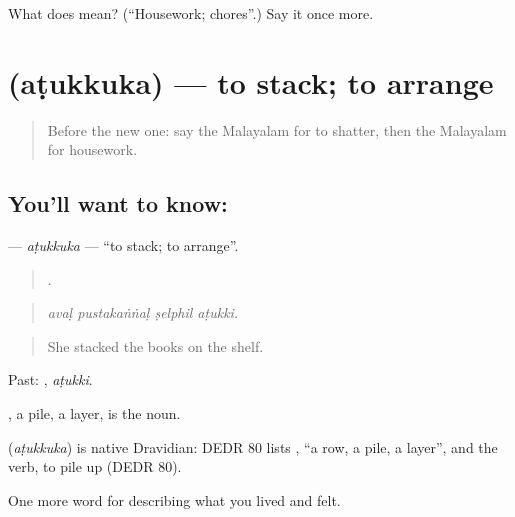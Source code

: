 \begin{tcolorbox}[breakable,colback=teal!4,colframe=teal!35!black,title={Before you move on}]
What does  mean? (\textquotedblleft{}Housework; chores\textquotedblright{}.) Say it once more.
\end{tcolorbox}
\section[\texorpdfstring{\ml{അടുക്കുക} (aṭukkuka)}{അടുക്കുക (aṭukkuka)}]{ (aṭukkuka) — to stack; to arrange}

\label{lesson:ML-C572-atukkuka}



\begin{quote}
Before the new one: say the Malayalam for to shatter, then the Malayalam for housework.
\end{quote}

\subsection*{You'll want to know: }
\textbf{} — \emph{aṭukkuka} — \textquotedblleft{}to stack; to arrange\textquotedblright{}.

\begin{quote}
   .
\end{quote}

\begin{quote}
\emph{avaḷ pustakaṅṅaḷ ṣelphil aṭukki.}
\end{quote}

\begin{quote}
She stacked the books on the shelf.
\end{quote}

Past: , \emph{aṭukki}.

, a pile, a layer, is the noun.

\begin{cousinweb}
\textbf{} (\emph{aṭukkuka}) is native Dravidian: DEDR 80 lists , \textquotedblleft{}a row, a pile, a layer\textquotedblright{}, and the verb, to pile up (DEDR 80).
\end{cousinweb}

\begin{grammarlens}[title={What you've built}]
One more word for describing what you lived and felt.
\end{grammarlens}

